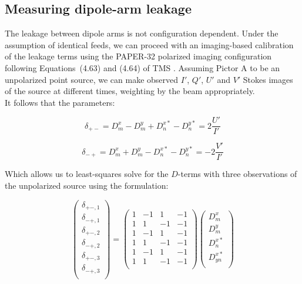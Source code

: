 \documentclass[10pt,a4paper,notitlepage]{article}
\begin{document}
\subsection{Measuring dipole-arm leakage}
\label{subsec:method_dterms}
The leakage between dipole arms is not configuration dependent. Under the assumption of identical feeds, we can proceed with an imaging-based calibration of the leakage terms using the PAPER-32 polarized imaging configuration following Equations~(4.63) and (4.64) of TMS \cite{TMS}. Assuming Pictor A to be an unpolarized point source, we can make observed $I'$, $Q'$, $U'$ and $V'$ Stokes images of the source at different times, weighting by the beam appropriately.  \\

It follows that the parameters:

\begin{equation}
\delta_{+-} = D^x_m - D^y_m + D^{x*}_n - D^{y*}_n = 2\frac{U'}{I'}
\end{equation}

\begin{equation}
\delta_{-+} = D^x_m + D^y_m - D^{x*}_n - D^{y*}_n = -2\frac{V'}{I'}
\end{equation}

\noindent Which allows us to least-squares solve for the $D$-terms with three observations of the unpolarized source using the formulation:

\begin{equation}
\begin{pmatrix}
\delta_{+-,1} \\
\delta_{-+,1} \\
\delta_{+-,2} \\
\delta_{-+,2} \\
\delta_{+-,3} \\
\delta_{-+,3} \\
\end{pmatrix}
=
\begin{pmatrix}
1 & -1 & 1 & -1 \\
1 & 1 & -1 & -1 \\
1 & -1 & 1 & -1 \\
1 & 1 & -1 & -1 \\
1 & -1 & 1 & -1 \\
1 & 1 & -1 & -1 \\
\end{pmatrix}
\begin{pmatrix}
D^x_{m}\\
D^y_{m}\\
D^{x*}_{n}\\
D^{x*}_{yn}\\
\end{pmatrix}
\label{eq:Dterms3times}
\end{equation}
\end{document}
